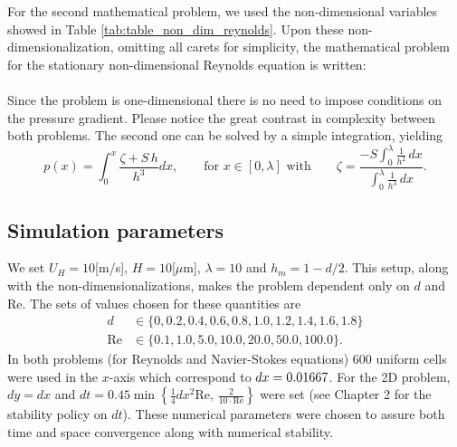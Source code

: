 For the second mathematical problem, we used the non-dimensional variables showed in Table \ref{tab:table_non_dim_reynolds}. Upon these non-dimensionalization, omitting all carets for simplicity, the mathematical problem for the stationary non-dimensional Reynolds equation is written:\\

\\

Since the problem is one-dimensional there is no need to impose conditions on the pressure gradient. Please notice the great contrast in complexity between both problems. The second one can be solved by a simple integration, yielding
$$p(x) = \int_0^x \frac{\zeta+S\,h}{h^3}dx,\qquad\text{for } x\in[0,\lambda]\text{ with}\qquad\zeta = \frac{-S\int_0^\lambda \frac{1}{h^2}\,dx}{\int_0^\lambda\frac{1}{h^3}\,dx}.$$

\subsection*{Simulation parameters}
We set $U_H=10$[m/s], $H=10$[$\mu$m], $\lambda=10$ and $h_m=1-d/2$. This setup, along with the non-dimensionalizations, makes the problem dependent only on $d$ and Re. The sets of values chosen for these quantities are
\begin{align*}
d&\in\{0,0.2,0.4,0.6,0.8,1.0,1.2,1.4,1.6,1.8\}\\
\text{Re}&\in\{0.1,1.0,5.0,10.0,20.0,50.0,100.0\}.
\end{align*}
In both problems (for Reynolds and Navier-Stokes equations) $600$ uniform cells were used in the $x$-axis which correspond to  $dx=\nobreak 0.01667$. For the 2D problem, $dy=dx$ and $dt=0.45\min\left\{{\frac{1}{4}dx^2\text{Re},\,\frac{2}{10\cdot\text{Re}}}\right\}$ were set (see \cite{prosperetti2009} Chapter 2 for the stability policy on $dt$). These numerical parameters were chosen to assure both time and space convergence along with numerical stability.
